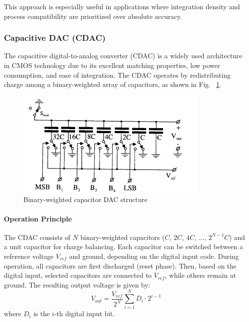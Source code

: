     This approach is especially useful in applications where integration density and process compatibility are prioritized over absolute accuracy.
\subsubsection{Capacitive DAC (CDAC)}
The capacitive digital-to-analog converter (CDAC) is a widely used architecture in CMOS technology due to its excellent matching properties, low power consumption, and ease of integration. The CDAC operates by redistributing charge among a binary-weighted array of capacitors, as shown in Fig. ~\ref{fig:binary_weighted_capacitor_dac}.

\begin{figure}[h]
    \centering
    \includegraphics[width=0.85\textwidth]{figs/binary_weighted_capacitor_dac.png}
    \caption{Binary-weighted capacitor DAC structure}
    \label{fig:binary_weighted_capacitor_dac}
\end{figure}

\paragraph{Operation Principle}
The CDAC consists of $N$ binary-weighted capacitors ($C$, $2C$, $4C$, ..., $2^{N-1}C$) and a unit capacitor for charge balancing. Each capacitor can be switched between a reference voltage $V_{ref}$ and ground, depending on the digital input code. During operation, all capacitors are first discharged (reset phase). Then, based on the digital input, selected capacitors are connected to $V_{ref}$, while others remain at ground. The resulting output voltage is given by:
\begin{equation}
    V_{out} = \frac{V_{ref}}{2^N} \sum_{i=1}^{N} D_i \cdot 2^{i-1}
\end{equation}
where $D_i$ is the $i$-th digital input bit.

